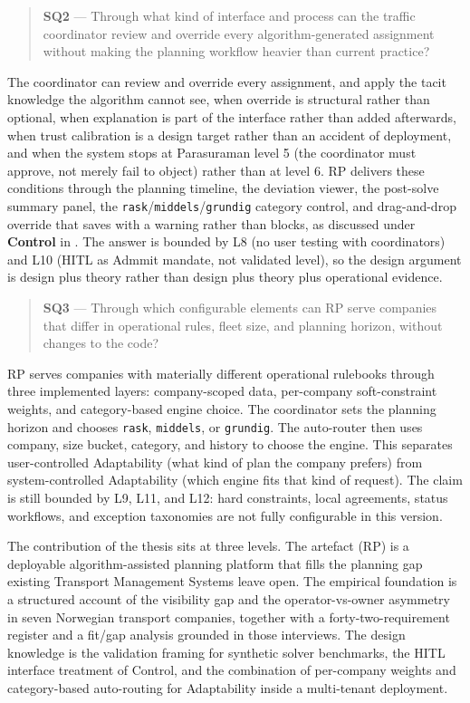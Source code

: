 \begin{quote}
\textbf{SQ2} — Through what kind of interface and process can the traffic coordinator review and override every algorithm-generated assignment without making the planning workflow heavier than current practice?
\end{quote}

The coordinator can review and override every assignment, and apply the tacit knowledge the algorithm cannot see, when override is structural rather than optional, when explanation is part of the interface rather than added afterwards, when trust calibration is a design target rather than an accident of deployment, and when the system stops at Parasuraman level 5 (the coordinator must approve, not merely fail to object) rather than at level 6. RP delivers these conditions through the planning timeline, the deviation viewer, the post-solve summary panel, the \texttt{rask}/\texttt{middels}/\texttt{grundig} category control, and drag-and-drop override that saves with a warning rather than blocks, as discussed under \textbf{Control} in . The answer is bounded by L8 (no user testing with coordinators) and L10 (HITL as Admmit mandate, not validated level), so the design argument is design plus theory rather than design plus theory plus operational evidence.

\begin{quote}
\textbf{SQ3} — Through which configurable elements can RP serve companies that differ in operational rules, fleet size, and planning horizon, without changes to the code?
\end{quote}

RP serves companies with materially different operational rulebooks through three implemented layers: company-scoped data, per-company soft-constraint weights, and category-based engine choice. The coordinator sets the planning horizon and chooses \texttt{rask}, \texttt{middels}, or \texttt{grundig}. The auto-router then uses company, size bucket, category, and history to choose the engine. This separates user-controlled Adaptability (what kind of plan the company prefers) from system-controlled Adaptability (which engine fits that kind of request). The claim is still bounded by L9, L11, and L12: hard constraints, local agreements, status workflows, and exception taxonomies are not fully configurable in this version.

The contribution of the thesis sits at three levels. The artefact (RP) is a deployable algorithm-assisted planning platform that fills the planning gap existing Transport Management Systems leave open. The empirical foundation is a structured account of the visibility gap and the operator-vs-owner asymmetry in seven Norwegian transport companies, together with a forty-two-requirement register and a fit/gap analysis grounded in those interviews. The design knowledge is the validation framing for synthetic solver benchmarks, the HITL interface treatment of Control, and the combination of per-company weights and category-based auto-routing for Adaptability inside a multi-tenant deployment.


